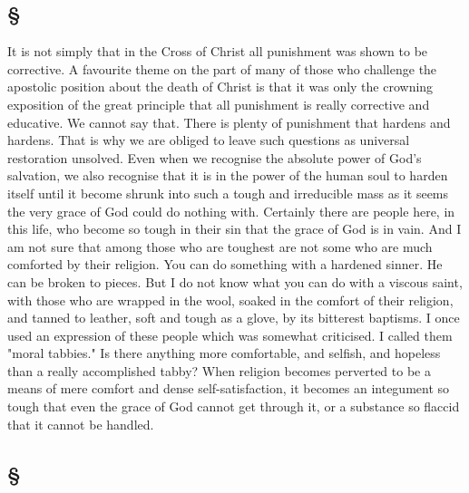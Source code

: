 \documentclass[draft]{ptfdoc}
\begin{document}
\subsection*{
\S
}

It is not simply that in the Cross of Christ 
all punishment was shown to be corrective. A 
favourite theme on the part of many of those 
who challenge the apostolic position about the 
death of Christ is that it was only the crowning 
exposition of the great principle that all punishment 
is really corrective and educative. We 
cannot say that. There is plenty of punishment 
that hardens and hardens. That is why we are 
obliged to leave such questions as universal 
restoration unsolved. Even when we recognise 
the absolute power of God's salvation, we also 
recognise that it is in the power of the human 
soul to harden itself until it become shrunk into 
such a tough and irreducible mass as it seems 
the very grace of God could do nothing with. 
Certainly there are people here, in this life, who 
become so tough in their sin that the grace of 
God is in vain. And I am not sure that among 
those who are toughest are not some who are 
much comforted by their religion. You can do 
something with a hardened sinner. He can be 
broken to pieces. But I do not know what 
you can do with a viscous saint, with those 
who are wrapped in the wool, soaked in the 
comfort of their religion, and tanned to leather, 
soft and tough as a glove, by its bitterest baptisms. 
I once used an expression of these people 
which was somewhat criticised. I called them 
"moral tabbies." Is there anything more comfortable, 
and selfish, and hopeless than a really 
accomplished tabby? When religion becomes 
perverted to be a means of mere comfort and 
dense self-satisfaction, it becomes an integument 
so tough that even the grace of God 
cannot get through it, or a substance so flaccid 
that it cannot be handled. 

\subsection*{
\S
}
\end{document}

